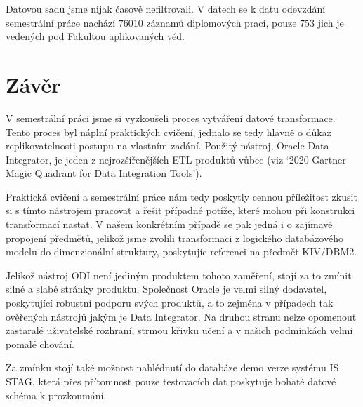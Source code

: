 Datovou sadu jsme nijak časově nefiltrovali.
V datech se k datu odevzdání semestrální práce nachází \( 76010 \) záznamů diplomových prací, pouze \( 753 \) jich je vedených pod Fakultou aplikovaných věd.

\section{Závěr}

V semestrální práci jsme si vyzkoušeli proces vytváření datové transformace.
Tento proces byl náplní praktických cvičení, jednalo se tedy hlavně o důkaz replikovatelnosti postupu na vlastním zadání.
Použitý nástroj, Oracle Data Integrator, je jeden z nejrozšířenějších ETL produktů vůbec (viz \enquote*{2020 Gartner Magic Quadrant for Data Integration Tools}).

Praktická cvičení a semestrální práce nám tedy poskytly cennou příležitost zkusit si s tímto nástrojem pracovat a řešit případné potíže, které mohou při konstrukci transformací nastat.
V našem konkrétním případě se pak jedná i o zajímavé propojení předmětů, jelikož jsme zvolili transformaci z logického databázového modelu do dimenzionální struktury, poskytujíc referenci na předmět KIV/DBM2.

Jelikož nástroj ODI není jediným produktem tohoto zaměření, stojí za to zmínit silné a slabé stránky produktu.
Společnost Oracle je velmi silný dodavatel, poskytující robustní podporu svých produktů, a to zejména v případech tak ověřených nástrojů jakým je Data Integrator.
Na druhou stranu nelze opomenout zastaralé uživatelské rozhraní, strmou křivku učení a v našich podmínkách velmi pomalé chování.

Za zmínku stojí také možnost nahlédnutí do databáze demo verze systému IS STAG, která přes přítomnost pouze testovacích dat poskytuje bohaté datové schéma k prozkoumání.
